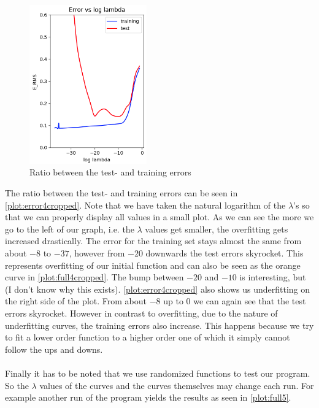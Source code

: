 \documentclass{article}
\begin{document}
	\begin{figure} %
		\centering
		\includegraphics[width=0.45\textwidth]{plots/error4cropped.png}
		\caption{Ratio between the test- and training errors}
		\label{plot:error4cropped}
	\end{figure}
	
	The ratio between the test- and training errors can be seen in \autoref{plot:error4cropped}. Note that we have taken the natural logarithm of the $\lambda$'s so that we can properly display all values in a small plot. As we can see the more we go to the left of our graph, i.e. the $\lambda$ values get smaller, the overfitting gets increased drastically. The error for the training set stays almost the same from about $-8$ to $-37$, however from $-20$ downwards the test errors skyrocket. This represents overfitting of our initial function and can also be seen as the orange curve in \autoref{plot:full4cropped}. The bump between $-20$ and $-10$ is interesting, but (I don't know why this exists). \autoref{plot:error4cropped} also shows us underfitting on the right side of the plot. From about $-8$ up to $0$ we can again see that the test errors skyrocket. However in contrast to overfitting, due to the nature of underfitting curves, the training errors also increase. This happens because we try to fit a lower order function to a higher order one of which it simply cannot follow the ups and downs. \\
	\\
	Finally it has to be noted that we use randomized functions to test our program. So the $\lambda$ values of the curves and the curves themselves may change each run. For example another run of the program yields the results as seen in \autoref{plot:full5}.
	
\end{document}
